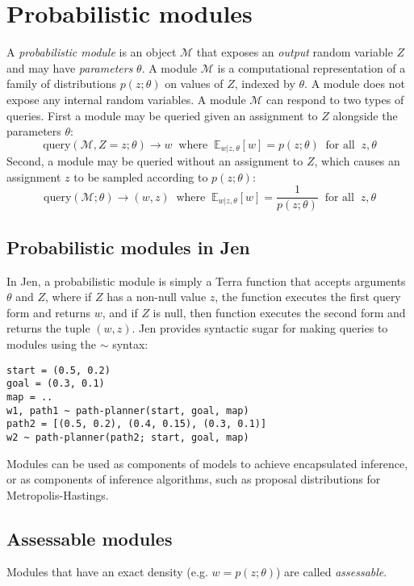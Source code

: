 \documentclass{article}
\begin{document}
\section{Probabilistic modules}
A \emph{probabilistic module} is an object $\mathcal{M}$ that exposes an \emph{output} random variable $Z$ and may have \emph{parameters} $\theta$.
A module $\mathcal{M}$ is a computational representation of a family of distributions $p(z; \theta)$ on values of $Z$, indexed by $\theta$.
A module does not expose any internal random variables.
A module $\mathcal{M}$ can respond to two types of queries.
First a module may be queried given an assignment to $Z$ alongside the parameters $\theta$:
\begin{equation}
\mbox{query}(\mathcal{M}, Z=z; \theta) \to w \;\; \mbox{where}\;\; \mathbb{E}_{w|z,\theta}[w] = p(z;\theta) \;\; \mbox{for all} \;\; z, \theta
\end{equation}
Second, a module may be queried without an assignment to $Z$, which causes an assignment $z$ to be sampled according to $p(z;\theta)$:
\begin{equation}
\mbox{query}(\mathcal{M}; \theta) \to (w, z) \;\; \mbox{where}\;\; \mathbb{E}_{w|z,\theta}[w] = \frac{1}{p(z; \theta)} \;\; \mbox{for all} \;\; z, \theta 
\end{equation}
\subsection{Probabilistic modules in Jen}
In Jen, a probabilistic module is simply a Terra function that accepts arguments $\theta$ and $Z$, where if $Z$ has a non-null value $z$, the function executes the first query form and returns $w$, and if $Z$ is null, then function executes the second form and returns the tuple $(w,z)$.
Jen provides syntactic sugar for making queries to modules using the $\sim$ syntax:
\begin{lstlisting}
start = (0.5, 0.2)
goal = (0.3, 0.1)
map = ..
w1, path1 ~ path-planner(start, goal, map)
path2 = [(0.5, 0.2), (0.4, 0.15), (0.3, 0.1)]
w2 ~ path-planner(path2; start, goal, map)
\end{lstlisting}
Modules can be used as components of models to achieve encapsulated inference, or as components of inference algorithms, such as proposal distributions for Metropolis-Hastings.

\subsection{Assessable modules}
Modules that have an exact density (e.g. $w = p(z;\theta)$) are called \emph{assessable}.
\end{document}
